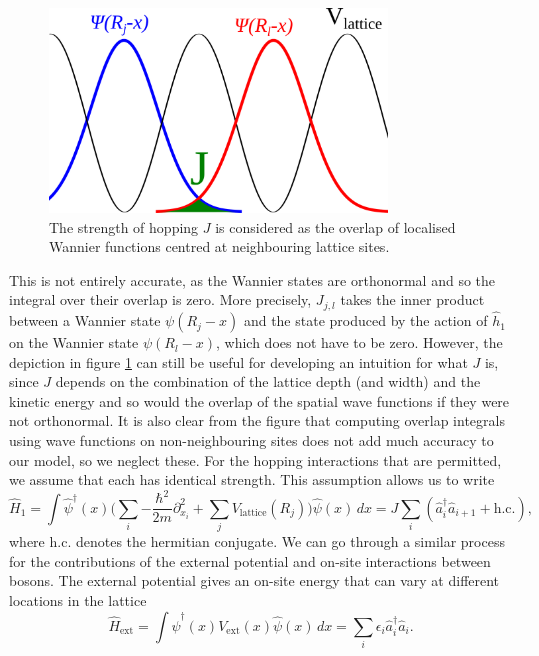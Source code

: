 \documentclass[a4paper, 10pt]{article}
\theoremstyle{plain}
\begin{document}
\begin{figure}[h!]
    \begin{center}
        \includegraphics[width=0.8\textwidth]{J_overlap_drawing_smaller}
    \end{center}
    \caption{\label{fig:J_overlap_drawing}
             The strength of hopping $J$ is considered as the overlap of
             localised Wannier functions centred at neighbouring lattice sites.}
\end{figure}
This is not entirely accurate, as the Wannier states are orthonormal and so the
integral over their overlap is zero. More precisely, $J_{j,l}$ takes the
inner product between a Wannier state $\psi(R_{j} - x)$ and the state produced
by the action of $\hat{h}_1$ on the Wannier state $\psi(R_{l} - x)$, which does
not have to be zero. However, the depiction in figure \ref{fig:J_overlap_drawing}
can still be useful for developing an intuition for what $J$ is, since $J$
depends on the combination of the lattice depth (and width) and the kinetic
energy and so would the overlap of the spatial wave functions if they were not
orthonormal. It is also clear from the figure that computing overlap integrals
using wave functions on non-neighbouring sites does not add much accuracy to our
model, so we neglect these. For the hopping interactions that are permitted, we
assume that each has identical strength. This assumption allows us to write
\begin{equation}
    \hat{H}_{1}
    =
    \int{\hat{\psi}^{\dagger}(x)
         \bigg(
            \!\sum_{i}{-\frac{\hbar^{2}}{2m} \partial_{x_{i}}^{2}} +
            \sum_{j}{V_{\text{lattice}}(R_{j})}
         \bigg)
         \hat{\psi}(x) \,dx}
    =
    J \sum_{i}{(\hat{a}^\dagger_{i}\hat{a}_{i+1} + \text{h.c.})},
\end{equation}
where $\text{h.c.}$ denotes the hermitian conjugate. We can go through a similar
process for the contributions of the external potential and on-site interactions
between bosons. The external potential gives an on-site energy that can vary at
different locations in the lattice
\begin{equation}
    \hat{H}_{\text{ext}}
    =
    \int{\hat{\psi}^{\dagger}(x) V_{\text{ext}}(x) \hat{\psi}(x) \,dx}
    =
    \sum_{i}{\epsilon_{i} \hat{a}_{i}^{\dagger} \hat{a}_{i}}.
\end{equation}
\end{document}
